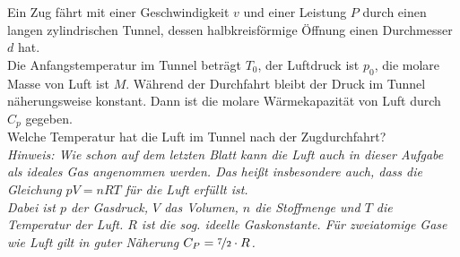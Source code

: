 \begin{Exercise}[title = Tunnel, origin = {EstPhO 2009}, difficulty = 3, label = train]
	Ein Zug fährt mit einer Geschwindigkeit $v$ und einer Leistung $P$ durch einen langen zylindrischen Tunnel, dessen halbkreisförmige Öffnung einen Durchmesser $d$ hat.\\
	Die Anfangstemperatur im Tunnel beträgt $T_0$, der Luftdruck ist $p_0$, die molare Masse von Luft ist $M$. Während der Durchfahrt bleibt der Druck im Tunnel näherungsweise konstant. Dann ist die molare Wärmekapazität von Luft durch $C_p$ gegeben.\\
	Welche Temperatur hat die Luft im Tunnel nach der Zugdurchfahrt?\\
	\textit{Hinweis: Wie schon auf dem letzten Blatt kann die Luft auch in dieser Aufgabe als \textit{ideales Gas} angenommen werden. Das heißt insbesondere auch, dass die Gleichung $pV = nRT$ für die Luft erfüllt ist. \\
	Dabei ist $p$ der Gasdruck, $V$ das Volumen, $n$ die Stoffmenge und $T$ die Temperatur der Luft. $R$ ist die sog. ideelle Gaskonstante. Für zweiatomige Gase wie Luft gilt in guter Näherung $C_P = \nicefrac{7}{2}\cdot R$.}
\end{Exercise}
	